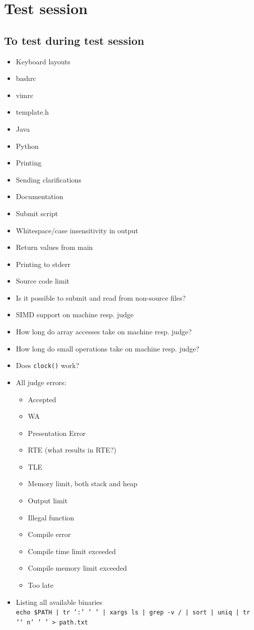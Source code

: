 \appendix
\chapter{Test session}

\section{To test during test session}
\begin{itemize}
	\item Keyboard layouts
	\item bashrc
	\item vimrc
	\item template.h
	\item Java
	\item Python
	\item Printing
	\item Sending clarifications
	\item Documentation
	\item Submit script
	\item Whitespace/case insensitivity in output
	\item Return values from main
	\item Printing to stderr
	\item Source code limit
	\item Is it possible to submit and read from non-source files?
	\item SIMD support on machine resp. judge
	\item How long do array accesses take on machine resp. judge?
	\item How long do small operations take on machine resp. judge?
	\item Does \texttt{clock()} work?
	\item All judge errors:
		\begin{itemize}
			\item Accepted
			\item WA
			\item Presentation Error
			\item RTE (what results in RTE?)
			\item TLE
			\item Memory limit, both stack and heap
			\item Output limit
			\item Illegal function
			\item Compile error
			\item Compile time limit exceeded
			\item Compile memory limit exceeded
			\item Too late
		\end{itemize}
	\item Listing all available binaries\\
		\texttt{echo \$PATH | tr ':' ' ' | xargs ls | grep -v / | sort | uniq | tr '\char`\\n' ' ' > path.txt}
\end{itemize}
